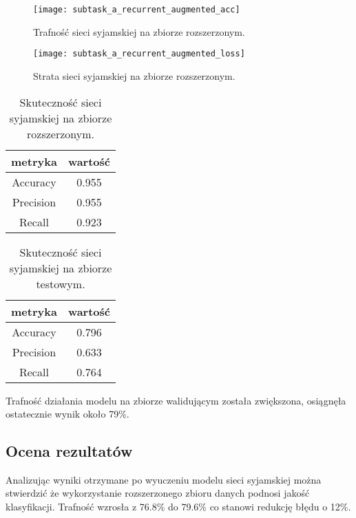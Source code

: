 \begin{figure}[H]
\centering
\texttt{[image: subtask\_a\_recurrent\_augmented\_acc]}
\caption{Trafność sieci syjamskiej na zbiorze rozszerzonym.}
\label{a_siamese_augmented_acc}
\end{figure}

\begin{figure}[H]
\centering
\texttt{[image: subtask\_a\_recurrent\_augmented\_loss]}
\caption{Strata sieci syjamskiej na zbiorze rozszerzonym.}
\label{a_siamese_augmented_loss}
\end{figure}


\begin{table}[H]
\caption{Skuteczność sieci syjamskiej na zbiorze rozszerzonym.}
\label{train_set_statistics_score_table_augmented}
    \begin{center}
        \begin{tabular}{ |c|c| } 
            \hline
            metryka & wartość\\
            \hline
            Accuracy & 0.955 \\
            \hline
            Precision & 0.955 \\
            \hline
            Recall & 0.923\\ 
            \hline
        \end{tabular}
    \end{center}
\end{table}

\begin{table}[H]
\caption{Skuteczność sieci syjamskiej na zbiorze testowym.}
\label{train_set_statistics_score_table_augmented}
    \begin{center}
        \begin{tabular}{ |c|c| } 
            \hline
            metryka & wartość\\
            \hline
            Accuracy & 0.796 \\
            \hline
            Precision & 0.633 \\
            \hline
            Recall & 0.764 \\ 
            \hline
        \end{tabular}
    \end{center}
\end{table}

Trafność działania modelu na zbiorze walidującym została zwiększona, osiągnęła ostatecznie wynik około 79\%.

\subsection{Ocena rezultatów}
Analizując wyniki otrzymane po wyuczeniu modelu sieci syjamskiej można stwierdzić że wykorzystanie rozszerzonego zbioru danych podnosi jakość klasyfikacji. Trafność wzrosła z 76.8\% do 79.6\% co stanowi redukcję błędu o 12\%.
